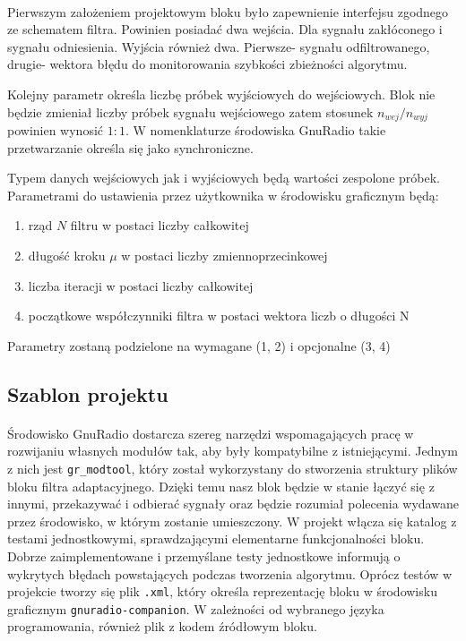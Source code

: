 \paragraph{}
Pierwszym założeniem projektowym bloku było zapewnienie interfejsu zgodnego ze schematem filtra. 
Powinien posiadać dwa wejścia. 
Dla sygnału zakłóconego i sygnału odniesienia. Wyjścia również dwa. 
Pierwsze- sygnału odfiltrowanego, drugie- wektora błędu do monitorowania szybkości zbieżności algorytmu.

Kolejny parametr określa liczbę próbek wyjściowych do wejściowych.
Blok nie będzie zmieniał liczby próbek sygnału wejściowego zatem stosunek $n_{wej}/n_{wyj}$
powinien wynosić $1:1$. W nomenklaturze środowiska GnuRadio takie przetwarzanie określa się jako synchroniczne.

Typem danych wejściowych jak i wyjściowych będą wartości zespolone próbek.
Parametrami do ustawienia przez użytkownika w środowisku graficznym będą:
\begin{enumerate}
 \item rząd $N$ filtru w postaci liczby całkowitej 
 \item długość kroku $\mu$ w postaci liczby zmiennoprzecinkowej
 \item liczba iteracji w postaci liczby całkowitej
 \item początkowe współczynniki filtra w postaci wektora liczb o długości N 
 \end{enumerate}
 
Parametry zostaną podzielone na wymagane (1, 2) i opcjonalne (3, 4)
\subsection{Szablon projektu}
\paragraph{}
Środowisko GnuRadio dostarcza szereg narzędzi wspomagających pracę w rozwijaniu własnych modułów tak, aby były kompatybilne z istniejącymi. 
Jednym z nich jest \texttt{gr\_modtool}, który został wykorzystany do stworzenia struktury plików bloku filtra adaptacyjnego. 
Dzięki temu nasz blok będzie w stanie łączyć się z innymi, przekazywać i odbierać sygnały oraz będzie rozumiał polecenia wydawane przez środowisko, w którym zostanie umieszczony. 
W projekt włącza się katalog z testami jednostkowymi, sprawdzającymi elementarne funkcjonalności bloku. 
Dobrze zaimplementowane i przemyślane testy jednostkowe informują o wykrytych błędach powstających podczas tworzenia algorytmu.
Oprócz testów w projekcie tworzy się plik \texttt{.xml}, który określa reprezentację bloku w środowisku graficznym \texttt{gnuradio-companion}. 
W zależności od wybranego języka programowania, również plik z kodem źródłowym bloku.
